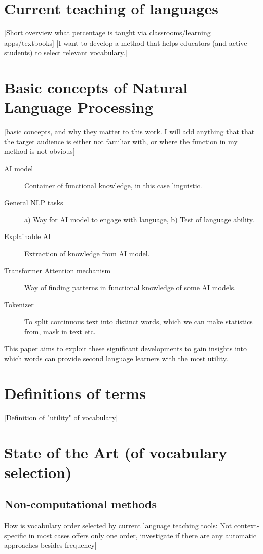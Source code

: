 \section{Current teaching of languages}
 [Short overview what percentage is taught via classrooms/learning apps/textbooks]
 [I want to develop a method that helps educators (and active students) to select relevant vocabulary.]

\section{Basic concepts of Natural Language Processing}
 [basic concepts, and why they matter to this work.
  I will add anything that that the target audience is either not familiar with, or where the function in my method is not obvious]

\begin{description}
	\item [AI model] Container of functional knowledge, in this case linguistic.
	\item [General NLP tasks] a) Way for AI model to engage with language, b) Test of language ability.
	\item [Explainable AI] Extraction of knowledge from AI model.
	\item [Transformer Attention mechanism] Way of finding patterns in functional knowledge of some AI models.
	\item [Tokenizer] To split continuous text into distinct words, which we can make statistics from, mask in text etc.
\end{description}

This paper aims to exploit these significant developments to gain insights into which words can provide second language learners with the most utility.

\section{Definitions of terms}
 [Definition of "utility" of vocabulary]

\section{State of the Art (of vocabulary selection)}
\subsection{Non-computational methods}
How is vocabulary order selected by current language teaching tools:
Not context-specific in most cases
offers only one order,
investigate if there are any automatic approaches besides frequency]

